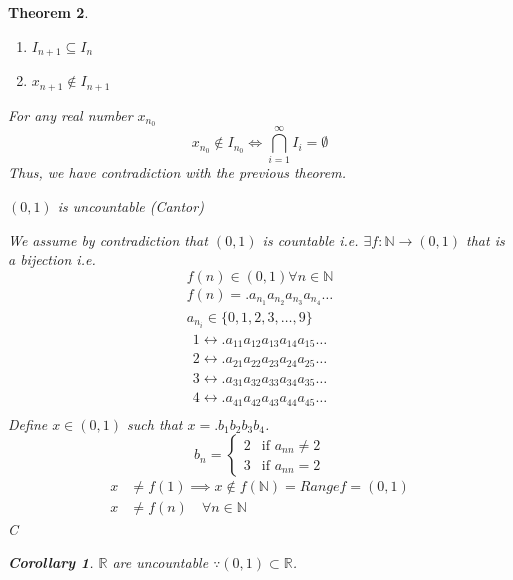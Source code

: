 \documentclass[letterpaper, 12pt]{article}
\newtheorem{theorem}{Theorem}[section]
\newtheorem{corollary}[theorem]{Corollary}
\newenvironment{proof}[1][Proof]{\begin{trivlist}
\item[\hskip \labelsep {\bfseries #1}]}{\end{trivlist}}
\newcommand{\naturals}{\mathbb{N}}
\newcommand{\reals}{\mathbb{R}}
\begin{document}
\begin{theorem}
\begin{enumerate}
\begin{proof}
\begin{enumerate}
                \item $I_{n+1} \subseteq I_n$
                \item $x_{n+1} \notin I_{n+1}$
            \end{enumerate}
            For any real number $x_{n_0}$
            \[x_{n_0} \notin I_{n_0} \iff \bigcap_{i=1}^\infty I_i = \emptyset\]
            Thus, we have contradiction with the previous theorem.
        \end{proof}
        \item $(0, 1)$ is uncountable (Cantor)
        \begin{proof}
            We assume by contradiction that $(0, 1)$ is countable i.e. 
            $\exists f: \naturals \rightarrow (0, 1)$ that is a bijection i.e. 
            \[f(n) \in (0, 1) \forall n \in \naturals\]
            \begin{gather*}
                f(n) = .a_{n_1}a_{n_2}a_{n_3}a_{n_4}\dots \\
                a_{n_i} \in \{0, 1, 2, 3, \dots, 9\}
            \end{gather*}
            \begin{align*}
                1 \leftrightarrow .a_{11}a_{12}a_{13}a_{14}a_{15}\dots \\
                2 \leftrightarrow .a_{21}a_{22}a_{23}a_{24}a_{25}\dots \\
                3 \leftrightarrow .a_{31}a_{32}a_{33}a_{34}a_{35}\dots \\
                4 \leftrightarrow .a_{41}a_{42}a_{43}a_{44}a_{45}\dots \\
            \end{align*}
            Define $x \in (0, 1)$ such that $x = .b_1 b_2 b_3 b_4$.
            \[b_n = \begin{cases}
                2 & \text{if } a_{nn} \ne 2 \\
                3 & \text{if } a_{nn} = 2
            \end{cases}\]
            \begin{align*}
                x &\ne f(1) \implies x \notin f(\naturals) = Range f = (0, 1) \\
                x &\ne f(n) \quad \forall n \in \naturals
            \end{align*}
            C
        \end{proof}
        \begin{corollary}
            $\reals$ are uncountable $\because (0, 1) \subset \reals$.
            \begin{align*}

\end{align*}
\end{corollary}
\end{enumerate}
\end{theorem}
\end{document}
